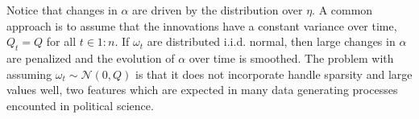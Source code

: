 \documentclass{article}
\newcommand{\paren}[1]{\ensuremath{\left(#1\right)}}
\newcommand{\dnorm}[1]{\ensuremath{\mathcal{N}\paren{#1}}}
\begin{document}
Notice that changes in $\alpha$ are driven by the distribution over $\eta$.
A common approach is to assume that the innovations have a constant variance over time, $Q_{t} = Q$  for all $t \in 1:n$.
If $\omega_{t}$ are distributed i.i.d. normal, then large changes in $\alpha$ are penalized and the evolution of $\alpha$ over time is smoothed.
The problem with assuming $\omega_{t} \sim \dnorm{0, Q}$ is that it does not incorporate handle sparsity and large values well, two features which are expected in many data generating processes encounted in political science.



\end{document}
